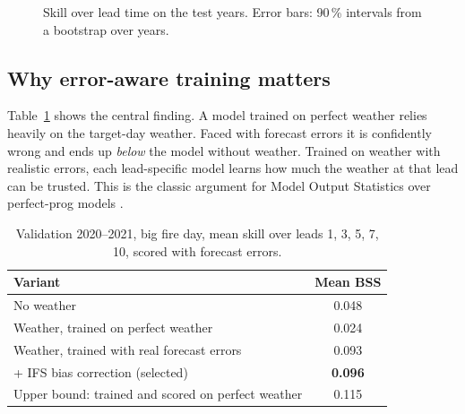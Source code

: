 \documentclass[conference,a4paper]{IEEEtran}
\begin{document}
\begin{figure}[t]
\centering
{}
\caption{Skill over lead time on the test years. Error bars: 90\,\% intervals from a bootstrap over years.}
\label{fig:skill}
\end{figure}

\subsection{Why error-aware training matters}
Table~\ref{tab:ablation} shows the central finding. A model trained on perfect weather relies heavily on the
target-day weather. Faced with forecast errors it is confidently wrong and ends up \emph{below} the model without weather.
Trained on weather with realistic errors, each lead-specific model learns how much the weather at that lead can be
trusted. This is the classic argument for Model Output Statistics over perfect-prog models \cite{glahn1972,klein1959}.

\begin{table}[t]
\centering
\caption{Validation 2020--2021, big fire day, mean skill over leads 1, 3, 5, 7, 10, scored with forecast errors.}
\label{tab:ablation}
\footnotesize
\begin{tabular}{@{}lc@{}}
\toprule
Variant & Mean BSS \\
\midrule
No weather & 0.048 \\
Weather, trained on perfect weather & 0.024 \\
Weather, trained with real forecast errors & 0.093 \\
\quad + IFS bias correction (selected) & \textbf{0.096} \\
\midrule
Upper bound: trained and scored on perfect weather & 0.115 \\
\bottomrule
\end{tabular}
\end{table}
\end{document}
